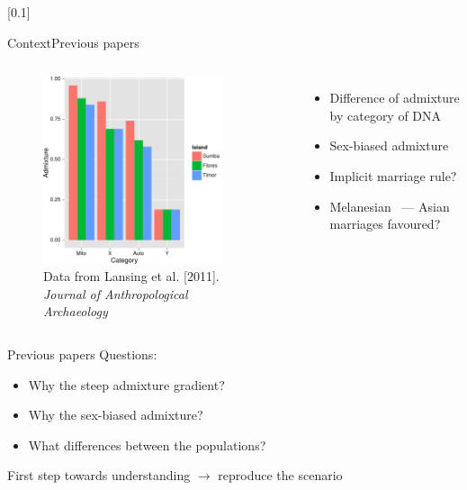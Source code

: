 \documentclass[10pt, aspectratio=43]{beamer}
\begin{document}
[0.1]{}{}{}
\begin{frame}{Context}{Previous papers}
\begin{columns}
  \begin{figure}
    \includegraphics[width=0.85\textwidth]{../data/lansing-modified.png}
    \caption{Data from Lansing et al. [2011]. \textit{Journal of
Anthropological Archaeology}}
  \end{figure}

  \begin{itemize}
    \item Difference of admixture by category of DNA
    \item Sex-biased admixture
    \item Implicit marriage rule?
    \item Melanesian~\mars{} --- Asian~\female{} marriages favoured?
  \end{itemize}

\end{columns}
\end{frame}

\begin{frame}{}{Previous papers}
Questions:
\begin{itemize}
  \item Why the steep admixture gradient?
  \item Why the sex-biased admixture?
  \item What differences between the populations?
\end{itemize}
\vspace*{2em}
First step towards understanding $\rightarrow$ reproduce the scenario
\end{frame}
\end{document}
